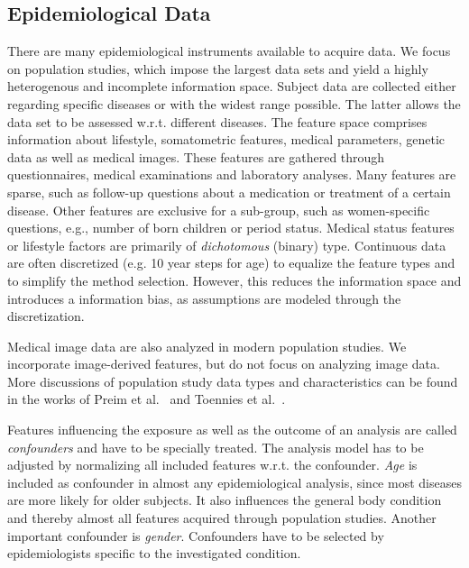 \documentclass[journal]{style/vgtc} 			          %
\begin{document}
\subsection{Epidemiological Data} \label{sec:EpidemiologicalData}
There are many epidemiological instruments available to acquire data. %
We focus on population studies, which impose the largest data sets and yield a highly heterogenous and incomplete information space.
Subject data are collected either regarding specific diseases or with the widest range possible.
The latter allows the data set to be assessed w.r.t. different diseases.
The feature space comprises information about lifestyle, somatometric features, medical parameters, genetic data as well as medical images.
These features are gathered through questionnaires, medical examinations and laboratory analyses.
Many features are sparse, such as follow-up questions about a medication or treatment of a certain disease.
Other features are exclusive for a sub-group, such as women-specific questions, e.g., number of born children or period status.
Medical status features or lifestyle factors are primarily of \emph{dichotomous} (binary) type.
Continuous data are often discretized (e.g. 10 year steps for age) to equalize the feature types and to simplify the method selection.
However, this reduces the information space and introduces a information bias, as assumptions are modeled through the discretization.

Medical image data are also analyzed in modern population studies.
We incorporate image-derived features, but do not focus on analyzing image data.
More discussions of population study data types and characteristics can be found in the works of Preim et al.~\cite{Preim2014} and Toennies et al.~\cite{Toennies2015}.

Features influencing the exposure as well as the outcome of an analysis are called \emph{confounders} and have to be specially treated.
The analysis model has to be adjusted by normalizing all included features w.r.t. the confounder.
\emph{Age} is included as confounder in almost any epidemiological analysis, since most diseases are more likely for older subjects.
It also influences the general body condition and thereby almost all features acquired through population studies.
Another important confounder is \emph{gender}.
Confounders have to be selected by epidemiologists specific to the investigated condition.
\end{document}
